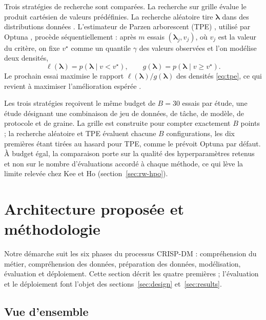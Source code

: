 \documentclass[11pt,a4paper]{article}
\theoremstyle{definition}
\begin{document}
Trois stratégies de recherche sont comparées. La recherche sur grille évalue le produit cartésien de valeurs prédéfinies. La recherche aléatoire tire $\boldsymbol\lambda$ dans des distributions données \cite{bergstra2012random}. L'estimateur de Parzen arborescent (TPE) \cite{bergstra2011algorithms}, utilisé par Optuna \cite{akiba2019optuna}, procède séquentiellement : après $m$ essais $(\boldsymbol\lambda_j, v_j)$, où $v_j$ est la valeur du critère, on fixe $v^\star$ comme un quantile $\gamma$ des valeurs observées et l'on modélise deux densités,
\begin{equation}
  \ell(\boldsymbol\lambda) = p(\boldsymbol\lambda \mid v < v^\star), \qquad g(\boldsymbol\lambda) = p(\boldsymbol\lambda \mid v \ge v^\star).
  \label{eq:tpe}
\end{equation}
Le prochain essai maximise le rapport $\ell(\boldsymbol\lambda)/g(\boldsymbol\lambda)$ des densités \eqref{eq:tpe}, ce qui revient à maximiser l'amélioration espérée \cite{bergstra2011algorithms}.

Les trois stratégies reçoivent le même budget de $B = 30$ essais par étude, une étude désignant une combinaison de jeu de données, de tâche, de modèle, de protocole et de graine. La grille est construite pour compter exactement $B$ points ; la recherche aléatoire et TPE évaluent chacune $B$ configurations, les dix premières étant tirées au hasard pour TPE, comme le prévoit Optuna par défaut. À budget égal, la comparaison porte sur la qualité des hyperparamètres retenus et non sur le nombre d'évaluations accordé à chaque méthode, ce qui lève la limite relevée chez Kee et Ho (section~\ref{sec:rw-hpo}).

\section{Architecture proposée et méthodologie}
\label{sec:framework}

Notre démarche suit les six phases du processus CRISP-DM \cite{wirth2000crisp} : compréhension du métier, compréhension des données, préparation des données, modélisation, évaluation et déploiement. Cette section décrit les quatre premières ; l'évaluation et le déploiement font l'objet des sections~\ref{sec:design} et~\ref{sec:results}.

\subsection{Vue d'ensemble}
\label{sec:pipeline}
\end{document}
